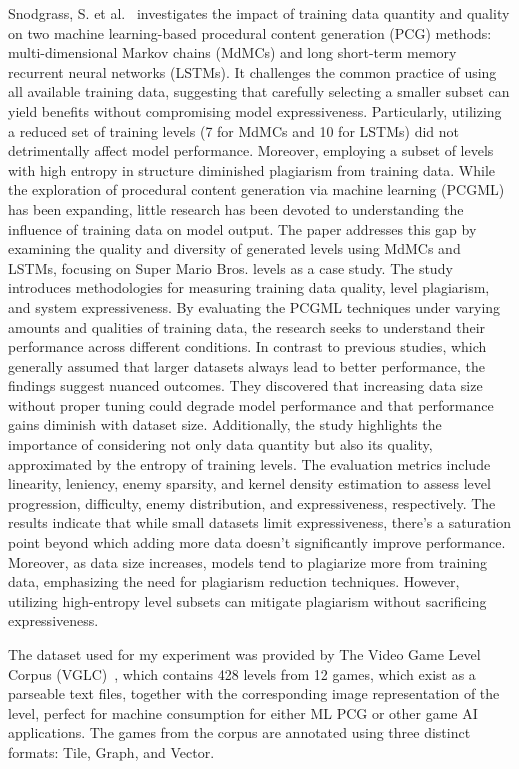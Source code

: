 \documentclass[runningheads]{llncs}
\begin{document}
Snodgrass, S. et al.~\cite{ref_article18} investigates the impact of training data quantity and quality on two machine learning-based procedural content generation (PCG) methods: multi-dimensional Markov chains (MdMCs) and long short-term memory recurrent neural networks (LSTMs). It challenges the common practice of using all available training data, suggesting that carefully selecting a smaller subset can yield benefits without compromising model expressiveness. Particularly, utilizing a reduced set of training levels (7 for MdMCs and 10 for LSTMs) did not detrimentally affect model performance. Moreover, employing a subset of levels with high entropy in structure diminished plagiarism from training data. While the exploration of procedural content generation via machine learning (PCGML) has been expanding, little research has been devoted to understanding the influence of training data on model output. The paper addresses this gap by examining the quality and diversity of generated levels using MdMCs and LSTMs, focusing on Super Mario Bros. levels as a case study. The study introduces methodologies for measuring training data quality, level plagiarism, and system expressiveness. By evaluating the PCGML techniques under varying amounts and qualities of training data, the research seeks to understand their performance across different conditions. In contrast to previous studies, which generally assumed that larger datasets always lead to better performance, the findings suggest nuanced outcomes. They discovered that increasing data size without proper tuning could degrade model performance and that performance gains diminish with dataset size. Additionally, the study highlights the importance of considering not only data quantity but also its quality, approximated by the entropy of training levels. The evaluation metrics include linearity, leniency, enemy sparsity, and kernel density estimation to assess level progression, difficulty, enemy distribution, and expressiveness, respectively. The results indicate that while small datasets limit expressiveness, there's a saturation point beyond which adding more data doesn't significantly improve performance. Moreover, as data size increases, models tend to plagiarize more from training data, emphasizing the need for plagiarism reduction techniques. However, utilizing high-entropy level subsets can mitigate plagiarism without sacrificing expressiveness.

The dataset used for my experiment was provided by The Video Game Level Corpus (VGLC)~\cite{ref_article16}, which contains 428 levels from 12 games, which exist as a parseable text files, together with the corresponding image representation of the level, perfect for machine consumption for either ML PCG or other game AI applications. The games from the corpus are annotated using three distinct formats: Tile, Graph, and Vector.
\end{document}
